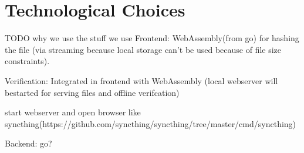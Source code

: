 \chapter*{Technological Choices}
\label{chap:technologies}
TODO why we use the stuff we use
Frontend:
WebAssembly(from go) for hashing the file (via streaming because local storage can't be used because of file size constraints).

Verification:
Integrated in frontend with WebAssembly (local webserver will bestarted for serving files and offline verifcation)

start webserver and open browser like syncthing(https://github.com/syncthing/syncthing/tree/master/cmd/syncthing)

Backend:
go?
